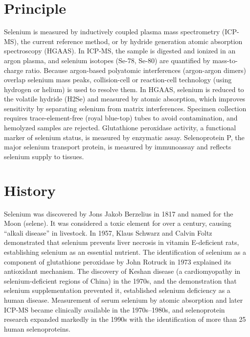 \section*{Principle}
Selenium is measured by inductively coupled plasma mass spectrometry (ICP-MS), the current reference method, or by hydride generation atomic absorption spectroscopy (HGAAS). In ICP-MS, the sample is digested and ionized in an argon plasma, and selenium isotopes (Se-78, Se-80) are quantified by mass-to-charge ratio. Because argon-based polyatomic interferences (argon-argon dimers) overlap selenium mass peaks, collision-cell or reaction-cell technology (using hydrogen or helium) is used to resolve them. In HGAAS, selenium is reduced to the volatile hydride (H2Se) and measured by atomic absorption, which improves sensitivity by separating selenium from matrix interferences. Specimen collection requires trace-element-free (royal blue-top) tubes to avoid contamination, and hemolyzed samples are rejected. Glutathione peroxidase activity, a functional marker of selenium status, is measured by enzymatic assay. Selenoprotein P, the major selenium transport protein, is measured by immunoassay and reflects selenium supply to tissues.

\section*{History}
Selenium was discovered by Jons Jakob Berzelius in 1817 and named for the Moon (selene). It was considered a toxic element for over a century, causing ``alkali disease'' in livestock. In 1957, Klaus Schwarz and Calvin Foltz demonstrated that selenium prevents liver necrosis in vitamin E-deficient rats, establishing selenium as an essential nutrient. The identification of selenium as a component of glutathione peroxidase by John Rotruck in 1973 explained its antioxidant mechanism. The discovery of Keshan disease (a cardiomyopathy in selenium-deficient regions of China) in the 1970s, and the demonstration that selenium supplementation prevented it, established selenium deficiency as a human disease. Measurement of serum selenium by atomic absorption and later ICP-MS became clinically available in the 1970s--1980s, and selenoprotein research expanded markedly in the 1990s with the identification of more than 25 human selenoproteins.

